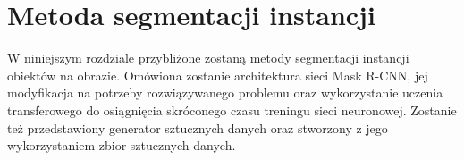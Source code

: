 \chapter{Metoda segmentacji instancji}
W niniejszym rozdziale przybliżone zostaną metody segmentacji instancji obiektów na obrazie.
Omówiona zostanie architektura sieci Mask R-CNN, jej modyfikacja na potrzeby rozwiązywanego problemu oraz wykorzystanie uczenia transferowego do osiągnięcia skróconego czasu treningu sieci neuronowej.
Zostanie też przedstawiony generator sztucznych danych oraz stworzony z jego wykorzystaniem zbior sztucznych danych.
